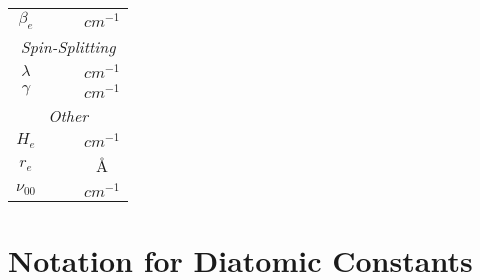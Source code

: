\documentclass[11pt, twoside, fleqn]{report}
\begin{document}
\begin{table}[H]
\begin{tabular}{cccc}
        $\beta_{e}$       &                           &                           & $\unit{cm^{-1}}$ \\
        \multicolumn{4}{c}{\textit{Spin-Splitting}}                                                  \\
        \cmidrule(lr){1-4}
        $\lambda$         &                           &                           & $\unit{cm^{-1}}$ \\
        $\gamma$          &                           &                           & $\unit{cm^{-1}}$ \\
        \multicolumn{4}{c}{\textit{Other}}                                                           \\
        \cmidrule(lr){1-4}
        $H_{e}$           &                           &                           & $\unit{cm^{-1}}$ \\
        $r_{e}$           &                           &                           & \AA              \\
        $\nu_{00}$        &                           &                           & $\unit{cm^{-1}}$ \\
        \bottomrule
    \end{tabular}
\end{table}

\chapter{Notation for Diatomic Constants}
\label{a:notation_for_diatomic_constants}
\end{document}
